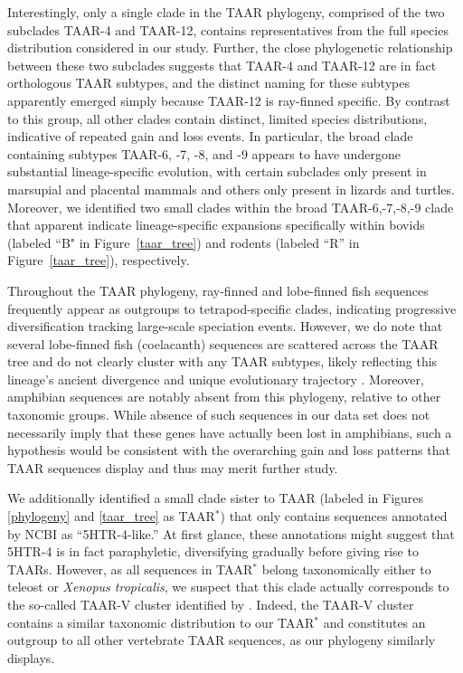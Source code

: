 \documentclass[fleqn,10pt]{wlpeerj}
\begin{document}
Interestingly, only a single clade in the TAAR phylogeny, comprised of the two subclades TAAR-4 and TAAR-12, contains representatives from the full species distribution considered in our study. Further, the close phylogenetic relationship between these two subclades suggests that TAAR-4 and TAAR-12 are in fact orthologous TAAR subtypes, and the distinct naming for these subtypes apparently emerged simply because TAAR-12 is ray-finned specific. By contrast to this group, all other clades contain distinct, limited species distributions, indicative of repeated gain and loss events. In particular, the broad clade containing subtypes TAAR-6, -7, -8, and -9 appears to have undergone substantial lineage-specific evolution, with certain subclades only present in marsupial and placental mammals and others only present in lizards and turtles. Moreover, we identified two small clades within the broad TAAR-6,-7,-8,-9 clade that apparent indicate lineage-specific expansions specifically within bovids (labeled ``B" in Figure~\ref{taar_tree}) and rodents (labeled ``R'' in Figure~\ref{taar_tree}), respectively.

Throughout the TAAR phylogeny, ray-finned and lobe-finned fish sequences frequently appear as outgroups to tetrapod-specific clades, indicating progressive diversification tracking large-scale speciation events. However, we do note that several lobe-finned fish (coelacanth) sequences are scattered across the TAAR tree and do not clearly cluster with any TAAR subtypes, likely reflecting this lineage's ancient divergence and unique evolutionary trajectory \citep{coelacanth2013}. Moreover, amphibian sequences are notably absent from this phylogeny, relative to other taxonomic groups. While absence of such sequences in our data set does not necessarily imply that these genes have actually been lost in amphibians, such a hypothesis would be consistent with the overarching gain and loss patterns that TAAR sequences display and thus may merit further study.

We additionally identified a small clade sister to TAAR (labeled in Figures \ref{phylogeny} and \ref{taar_tree} as TAAR$^\ast$) that only contains sequences annotated by NCBI as ``5HTR-4-like.'' At first glance, these annotations might suggest that 5HTR-4 is in fact paraphyletic, diversifying gradually before giving rise to TAARs. However, as all sequences in TAAR$^\ast$ belong taxonomically either to teleost or \emph{Xenopus tropicalis}, we suspect that this clade actually corresponds to the so-called TAAR-V cluster identified by \cite{Hashiguchi2007}. Indeed, the TAAR-V cluster contains a similar taxonomic distribution to our TAAR$^\ast$ and constitutes an outgroup to all other vertebrate TAAR sequences, as our phylogeny similarly displays. 
\end{document}
